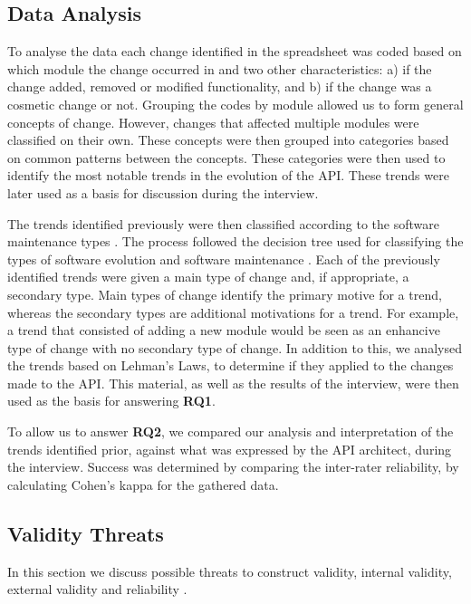 \documentclass{sig-alternate}
\begin{document}
\subsection{Data Analysis} \label{data_analysis}

To analyse the data each change identified in the spreadsheet was coded based on which module the change occurred in and two other characteristics: a) if the change added, removed or modified functionality, and b) if the change was a cosmetic change or not.
Grouping the codes by module allowed us to form general concepts of change. However, changes that affected multiple modules were classified on their own.
These concepts were then grouped into categories based on common patterns between the concepts.
These categories were then used to identify the most notable trends in the evolution of the API. These trends were later used as a basis for discussion during the interview.

The trends identified previously were then classified according to the software maintenance types \cite{chapin2001types}. The process followed the decision tree used for classifying the types of software evolution and software maintenance \cite{chapin2001types}. Each of the previously identified trends were given a main type of change and, if appropriate, a secondary type. Main types of change identify the primary motive for a trend, whereas the secondary types are additional motivations for a trend. For example, a trend that consisted of adding a new module would be seen as an enhancive type of change with no secondary type of change. In addition to this, we analysed the trends based on Lehman's Laws, to determine if they applied to the changes made to the API. This material, as well as the results of the interview, were then used as the basis for answering \textbf{RQ1}.

To allow us to answer \textbf{RQ2}, we compared our analysis and interpretation of the trends identified prior, against what was expressed by the API architect, during the interview. Success was determined by comparing the inter-rater reliability, by calculating Cohen's kappa \cite{cohen1968weighted} for the gathered data. 





\subsection{Validity Threats} \label{validity_threats} 
In this section we discuss possible threats to construct validity, internal validity, external validity and reliability \cite{runeson2009guidelines}.
\end{document}

